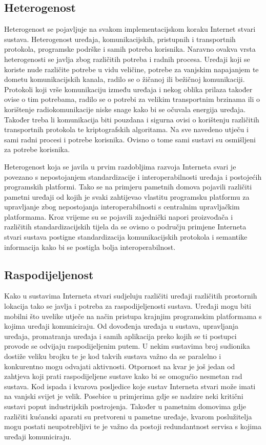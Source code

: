 \documentclass[times, utf8, diplomski]{fer}
\begin{document}
\subsection{Heterogenost}
Heterogenost se pojavljuje na svakom implementacijskom koraku Internet stvari sustava. Heterogenost uređaja, komunikacijskih, pristupnih i transportnih protokola, programske podrške i samih potreba korisnika. Naravno ovakva vrsta heterogenosti se javlja zbog različitih potreba i radnih procesa. Uređaji koji se koriste nude različite potrebe u vidu veličine, potrebe za vanjskim napajanjem te dometu komunikacijskih kanala, radilo se o žičanoj ili bežičnoj komunikaciji. Protokoli koji vrše komunikaciju između uređaja i nekog oblika prilaza također ovise o tim potrebama, radilo se o potrebi za velikim transportnim brzinama ili o korištenje radiokomunikacije niske snage kako bi se očuvala energija uređaja. Također treba li komunikacija biti pouzdana i sigurna ovisi o korištenju različitih transportnih protokola te kriptografskih algoritama. Na sve navedeno utječu i sami radni procesi i potrebe korisnika. Ovisno o tome sami sustavi su osmišljeni za potrebe korisnika.

Heterogenost koja se javila u prvim razdobljima razvoja Interneta svari je povezano s nepostojanjem standardizacije i interoperabilnosti uređaja i postojećih programskih platformi. Tako se na primjeru pametnih domova pojavili različiti pametni uređaji od kojih je svaki zahtijevao vlastitu programsku platformu za upravljanje zbog nepostojanja interoperabilnosti s centralnim upravljačkim platformama. Kroz vrijeme su se pojavili zajednički napori proizvođača i različitih standardizacijskih tijela da se ovisno o području primjene Interneta stvari sustava postigne standardizacija komunikacijskih protokola i semantike informacija kako bi se postigla bolja interoperabilnost.

\subsection{Raspodijeljenost}
Kako u sustavima Interneta stvari sudjeluju različiti uređaji različitih prostornih lokacija tako se javlja i potreba za raspodijeljenosti sustava. Uređaji mogu biti mobilni što uvelike utječe na način pristupa krajnjim programskim platformama s kojima uređaji komuniciraju. Od dovođenja uređaja u sustava, upravljanja uređaja, promatranja uređaja i samih aplikacija preko kojih se ti postupci provode se odvijaju raspodijeljenim putem. U nekim sustavima broj sudionika dostiže veliku brojku te je kod takvih sustava važno da se paralelno i konkurentno mogu odvajati aktivnosti. Otpornost na kvar je još jedan od zahtjeva koji prati raspodijeljene sustave kako bi se omogućio nesmetan rad sustava. Kod ispada i kvarova posljedice koje sustav Interneta stvari može imati na vanjski svijet je velik. Posebice u primjerima gdje se nadzire neki kritični sustavi poput industrijskih postrojenja. Također u pametnim domovima gdje različiti kućanski aparati su pretvoreni u pametne uređaje, kvarom poslužitelja mogu postati neupotrebljivi te je važno da postoji redundantnost servisa s kojima uređaji komuniciraju.
\end{document}

